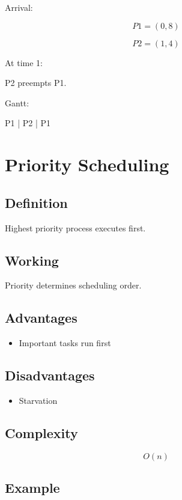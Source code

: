 Arrival:

\[
P1=(0,8)
\]

\[
P2=(1,4)
\]

At time 1:

P2 preempts P1.

Gantt:

\begin{center}
P1 | P2 | P1
\end{center}

\section{Priority Scheduling}

\subsection{Definition}

Highest priority process executes first.

\subsection{Working}

Priority determines scheduling order.

\subsection{Advantages}

\begin{itemize}
\item Important tasks run first
\end{itemize}

\subsection{Disadvantages}

\begin{itemize}
\item Starvation
\end{itemize}

\subsection{Complexity}

\[
O(n)
\]

\subsection{Example}

